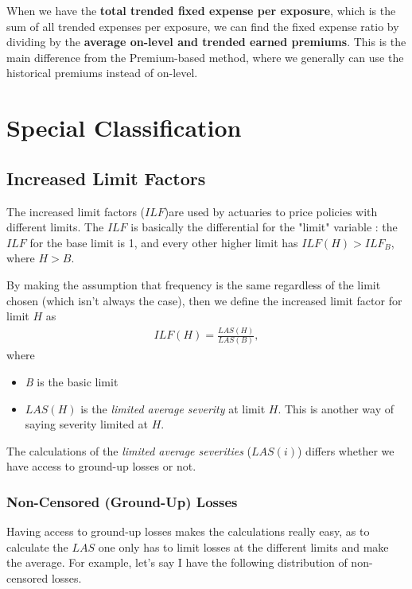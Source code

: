 \documentclass[11pt, english]{memoir}
\numberwithin{definition}{section}
\begin{document}
		
		When we have the \textbf{total trended fixed expense per exposure}, which is the sum of all trended expenses per exposure, we can find the fixed expense ratio by dividing by the \textbf{average on-level and trended earned premiums}. This is the main difference from the Premium-based method, where we generally can use the historical premiums instead of on-level.
	
	
	
	
	








\chapter{Special Classification}

\section{Increased Limit Factors}


The increased limit factors ($ ILF $)are used by actuaries to price policies with different limits. The $ ILF $ is basically the differential for the "limit" variable : the $ ILF $ for the base limit is 1, and every other higher limit has $ ILF(H) > ILF_{B} $, where $ H > B  $. 

By making the assumption that frequency is the same regardless of the limit chosen (which isn't always the case), then we define the increased limit factor for limit $ H $ as 
\begin{align*}
ILF(H) = \frac{LAS(H)}{LAS(B)},
\end{align*}
where 
\begin{itemize}
	\item \emph{B} is the basic limit
	\item $ LAS(H) $ is the \emph{limited average severity} at limit $ H $. This is another way of saying severity limited at $ H $.
\end{itemize}

The calculations of the \emph{limited average severities} ($ LAS(i) $) differs whether we have access to ground-up losses or not. 

\subsection{Non-Censored (Ground-Up) Losses}
	Having access to ground-up losses makes the calculations really easy, as to calculate the $ LAS $ one only has to limit losses at the different limits and make the average. For example, let's say I have the following distribution of non-censored losses.
\end{document}
